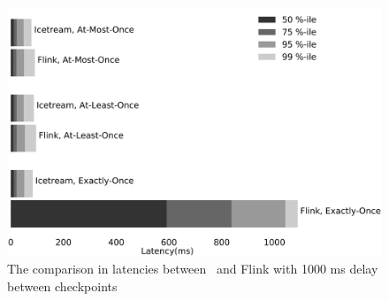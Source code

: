 \begin{figure}[htbp]
  \centering
  \includegraphics[width=.5\textwidth]{pics/comparison1000}
  \caption{The comparison in latencies between \FlameStream\ and Flink with 1000 ms delay between checkpoints}
  \label {comparison1000}
\end{figure}
